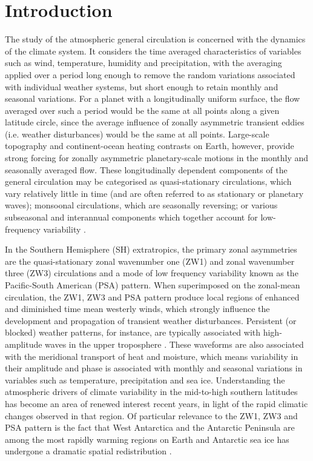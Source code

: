 
\chapter{Introduction}


The study of the atmospheric general circulation is concerned with the dynamics of the climate system. It considers the time averaged characteristics of variables such as wind, temperature, humidity and precipitation, with the averaging applied over a period long enough to remove the random variations associated with individual weather systems, but short enough to retain monthly and seasonal variations. For a planet with a longitudinally uniform surface, the flow averaged over such a period would be the same at all points along a given latitude circle, since the average influence of zonally asymmetric transient eddies (i.e. weather disturbances) would be the same at all points. Large-scale topography and continent-ocean heating contrasts on Earth, however, provide strong forcing for zonally asymmetric planetary-scale motions in the monthly and seasonally averaged flow. These longitudinally dependent components of the general circulation may be categorised as quasi-stationary circulations, which vary relatively little in time (and are often referred to as stationary or planetary waves); monsoonal circulations, which are seasonally reversing; or various subseasonal and interannual components which together account for low-frequency variability \citep{Holton2013}. 

In the Southern Hemisphere (SH) extratropics, the primary zonal asymmetries are the quasi-stationary zonal wavenumber one (ZW1) and zonal wavenumber three (ZW3) circulations and a mode of low frequency variability known as the Pacific-South American (PSA) pattern. When superimposed on the zonal-mean circulation, the ZW1, ZW3 and PSA pattern produce local regions of enhanced and diminished time mean westerly winds, which strongly influence the development and propagation of transient weather disturbances. Persistent (or blocked) weather patterns, for instance, are typically associated with high-amplitude waves in the upper troposphere \citep[e.g.][]{Trenberth1985,Renwick2005}. These waveforms are also associated with the meridional transport of heat and moisture, which means variability in their amplitude and phase is associated with monthly and seasonal variations in variables such as temperature, precipitation and sea ice. Understanding the atmospheric drivers of climate variability in the mid-to-high southern latitudes has become an area of renewed interest recent years, in light of the rapid climatic changes observed in that region. Of particular relevance to the ZW1, ZW3 and PSA pattern is the fact that West Antarctica and the Antarctic Peninsula are among the most rapidly warming regions on Earth \citep[e.g.][]{Nicolas2014} and Antarctic sea ice has undergone a dramatic spatial redistribution \citep[e.g.][]{Simmonds2015}. 

